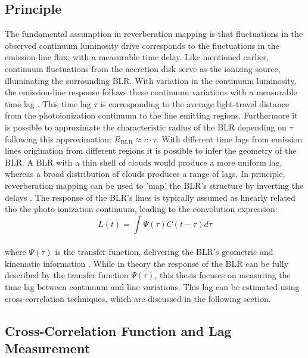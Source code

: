 \subsection{Principle}
\label{subsec:rm_principle}

The fundamental assumption in reverberation mapping is that fluctuations in the observed continuum luminosity drive corresponds to the fluctuations in the emission-line flux, with a measurable time delay. Like mentioned earlier, continuum fluctuations from the accretion disk serve as the ionizing source, illuminating the surrounding BLR. With variation in the continuum luminosity, the emission-line response follows these continuum variations with a measurable time lag \parencite{Cackett2021}.
This time lag $\tau$ is corresponding to the average light-travel distance from the photoionization continuum to the line emitting regions. Furthermore it is possible to approximate the characteristic radius of the BLR depending on $\tau$ following this approximation: $R_{\mathrm{BLR}} \approx c \cdot \tau$. With different time lags from emission lines origination from different regions it is possible to infer the geometry of the BLR. A BLR with a thin shell of clouds would produce a more uniform lag, whereas a broad distribution of clouds produces a range of lags. In principle, reverberation mapping can be used to 'map' the BLR’s structure by inverting the delays \parencite{peterson1997introduction}.
The response of the BLR's lines is typically assumed as linearly related tho the photo-ionization continuum, leading to the convolution expression:
\\
\begin{equation}
	L\left(t\right) = \int \Psi\left(\tau\right)C\left(t-\tau\right) d\tau
\end{equation}
\\
where $\Psi\left(\tau\right)$ is the transfer function, delivering the BLR's geometric and kinematic information \parencite{horne2004observational}.
While in theory the response of the BLR can be fully described by the transfer function $\Psi\left(\tau\right)$, this thesis focuses on measuring the time lag between continuum and line variations. This lag can be estimated using cross-correlation techniques, which are discussed in the following section.


\subsection{Cross-Correlation Function and Lag Measurement}
\label{subsec:rm_ccf}

